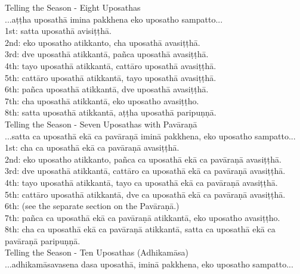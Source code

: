 Telling the Season - Eight Uposathas\\

...aṭṭha uposathā imina pakkhena eko uposatho sampatto...\\

1st: satta uposathā avisiṭṭhā.\\
2nd: eko uposatho atikkanto, cha uposathā avasiṭṭhā.\\
3rd: dve uposathā atikkantā, pañca uposathā avasiṭṭhā.\\
4th: tayo uposathā atikkantā, cattāro uposathā avasiṭṭhā.\\
5th: cattāro uposathā atikkantā, tayo uposathā avasiṭṭhā.\\
6th: pañca uposathā atikkantā, dve uposathā avasiṭṭhā.\\
7th: cha uposathā atikkantā, eko uposatho avasiṭṭho.\\
8th: satta uposathā atikkantā, aṭṭha uposathā paripuṇṇā.\\

Telling the Season - Seven Uposathas with Pavāraṇā\\

...satta ca uposathā ekā ca pavāraṇā iminā pakkhena, eko uposatho sampatto...\\

1st: cha ca uposathā ekā ca pavāraṇā avasiṭṭhā.\\
2nd: eko uposatho atikkanto, pañca ca uposathā ekā ca pavāraṇā avasiṭṭhā.\\
3rd: dve uposathā atikkantā, cattāro ca uposathā ekā ca pavāraṇā avasiṭṭhā.\\
4th: tayo uposathā atikkantā, tayo ca uposathā ekā ca pavāraṇā avasiṭṭhā.\\
5th: cattāro uposathā atikkantā, dve ca uposathā ekā ca pavāraṇā avasiṭṭhā.\\
6th: (see the separate section on the Pavāraṇā.)\\
7th: pañca ca uposathā ekā ca pavāraṇā atikkantā, eko uposatho avasiṭṭho.\\
8th: cha ca uposathā ekā ca pavāraṇā atikkantā, satta ca uposathā ekā ca pavāraṇā paripuṇṇā.\\

Telling the Season - Ten Uposathas (Adhikamāsa)\\

...adhikamāsavasena dasa uposathā, iminā pakkhena, eko uposatho sampatto...\\

